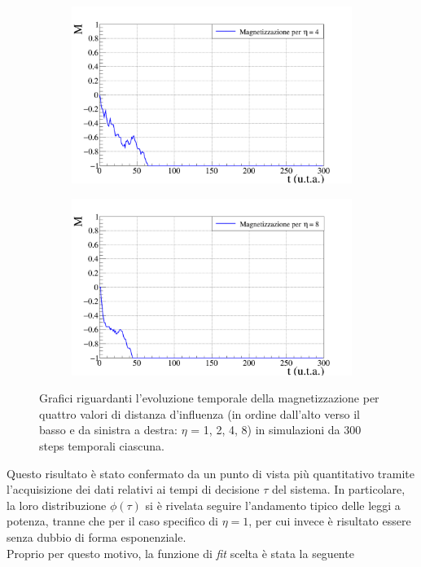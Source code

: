 \documentclass[letterpaper,10pt]{article}
\begin{document}
\begin{figure}
\ContinuedFloat
\centering
\begin{subfigure}{0.95\textwidth}
\includegraphics[width=\linewidth]{Immagini/partial_magn_graph_v4.png}
\end{subfigure}
\begin{subfigure}{0.95\textwidth}
\includegraphics[width=\linewidth]{Immagini/partial_magn_graph_v8.png}
\end{subfigure}
\caption{Grafici riguardanti l'evoluzione temporale della magnetizzazione per quattro valori di distanza d'influenza (in ordine dall'alto verso il basso e da sinistra a destra: $\eta$ = 1, 2, 4, 8) in simulazioni da 300 steps temporali ciascuna.}
\label{Fig:14}
\end{figure}

\bigskip  \bigskip  \bigskip  
Questo risultato è stato confermato da un punto di vista più quantitativo tramite l'acquisizione dei dati relativi ai tempi di decisione $\tau$ del sistema. In particolare, la loro distribuzione $\phi(\tau)$ si è rivelata seguire l'andamento tipico delle leggi a potenza, tranne che per il caso specifico di $\eta = 1$, per cui invece è risultato essere senza dubbio di forma esponenziale.
\\ Proprio per questo motivo, la funzione di \textit{fit} scelta è stata la seguente
\end{document}
